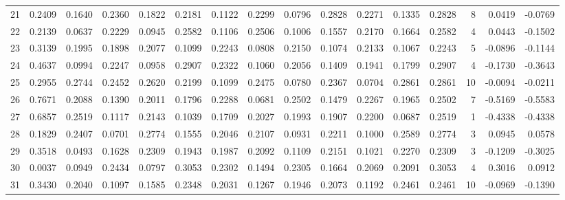 \begin{tabular}{lrrrrrrrrrrrrrrr}
21  &      0.2409 &  0.1640 &  0.2360 &  0.1822 &  0.2181 &  0.1122 &  0.2299 &  0.0796 &  0.2828 &  0.2271 &   0.1335 &     0.2828 &      8 &                    0.0419 &                    -0.0769 \\
22  &      0.2139 &  0.0637 &  0.2229 &  0.0945 &  0.2582 &  0.1106 &  0.2506 &  0.1006 &  0.1557 &  0.2170 &   0.1664 &     0.2582 &      4 &                    0.0443 &                    -0.1502 \\
23  &      0.3139 &  0.1995 &  0.1898 &  0.2077 &  0.1099 &  0.2243 &  0.0808 &  0.2150 &  0.1074 &  0.2133 &   0.1067 &     0.2243 &      5 &                   -0.0896 &                    -0.1144 \\
24  &      0.4637 &  0.0994 &  0.2247 &  0.0958 &  0.2907 &  0.2322 &  0.1060 &  0.2056 &  0.1409 &  0.1941 &   0.1799 &     0.2907 &      4 &                   -0.1730 &                    -0.3643 \\
25  &      0.2955 &  0.2744 &  0.2452 &  0.2620 &  0.2199 &  0.1099 &  0.2475 &  0.0780 &  0.2367 &  0.0704 &   0.2861 &     0.2861 &     10 &                   -0.0094 &                    -0.0211 \\
26  &      0.7671 &  0.2088 &  0.1390 &  0.2011 &  0.1796 &  0.2288 &  0.0681 &  0.2502 &  0.1479 &  0.2267 &   0.1965 &     0.2502 &      7 &                   -0.5169 &                    -0.5583 \\
27  &      0.6857 &  0.2519 &  0.1117 &  0.2143 &  0.1039 &  0.1709 &  0.2027 &  0.1993 &  0.1907 &  0.2200 &   0.0687 &     0.2519 &      1 &                   -0.4338 &                    -0.4338 \\
28  &      0.1829 &  0.2407 &  0.0701 &  0.2774 &  0.1555 &  0.2046 &  0.2107 &  0.0931 &  0.2211 &  0.1000 &   0.2589 &     0.2774 &      3 &                    0.0945 &                     0.0578 \\
29  &      0.3518 &  0.0493 &  0.1628 &  0.2309 &  0.1943 &  0.1987 &  0.2092 &  0.1109 &  0.2151 &  0.1021 &   0.2270 &     0.2309 &      3 &                   -0.1209 &                    -0.3025 \\
30  &      0.0037 &  0.0949 &  0.2434 &  0.0797 &  0.3053 &  0.2302 &  0.1494 &  0.2305 &  0.1664 &  0.2069 &   0.2091 &     0.3053 &      4 &                    0.3016 &                     0.0912 \\
31  &      0.3430 &  0.2040 &  0.1097 &  0.1585 &  0.2348 &  0.2031 &  0.1267 &  0.1946 &  0.2073 &  0.1192 &   0.2461 &     0.2461 &     10 &                   -0.0969 &                    -0.1390 \\

\end{tabular}
